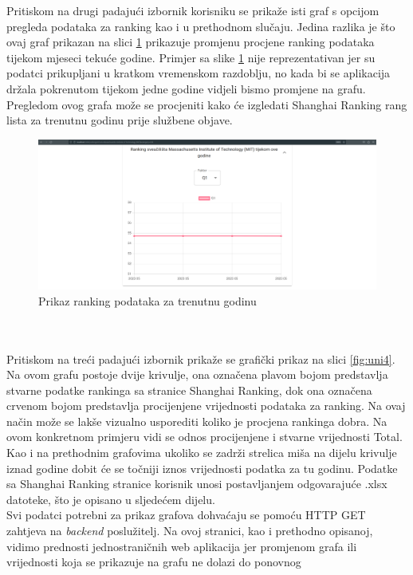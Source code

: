 \documentclass[times, utf8, zavrsni]{fer}
\begin{document}
\FloatBarrier 
Pritiskom na drugi padajući izbornik korisniku se prikaže isti graf s opcijom pregleda podataka za ranking
kao i u prethodnom slučaju. Jedina razlika je što ovaj graf prikazan na slici \ref{fig:uni3}
prikazuje promjenu procjene ranking podataka tijekom mjeseci tekuće godine. Primjer sa slike \ref{fig:uni3} nije reprezentativan jer su podatci 
prikupljani u kratkom vremenskom razdoblju, no kada bi se aplikacija držala pokrenutom tijekom jedne godine vidjeli bismo promjene na grafu. Pregledom ovog 
grafa može se procjeniti kako će izgledati Shanghai Ranking rang lista za trenutnu godinu prije službene objave. 
\begin{figure}[htb]
    \hspace*{-2cm}  
       \includegraphics[scale=0.21]{uni3.png} 
       \caption{Prikaz ranking podataka za trenutnu godinu}
       \label{fig:uni3}
       \end{figure} 
\\\\Pritiskom na treći padajući izbornik prikaže se grafički prikaz na slici \ref{fig:uni4}. Na ovom grafu postoje dvije krivulje, ona označena plavom bojom predstavlja 
stvarne podatke rankinga sa stranice Shanghai Ranking, dok ona označena crvenom bojom predstavlja procijenjene vrijednosti podataka za ranking.
Na ovaj način može se lakše vizualno usporediti koliko je procjena rankinga dobra. Na ovom konkretnom primjeru vidi se odnos procijenjene i stvarne 
vrijednosti Total. Kao i na prethodnim grafovima ukoliko se zadrži strelica miša na dijelu krivulje iznad godine dobit će se točniji iznos 
vrijednosti podatka za tu godinu.
Podatke sa Shanghai Ranking stranice korisnik unosi postavljanjem  
odgovarajuće .xlsx datoteke, što je opisano u sljedećem dijelu.
\\Svi podatci potrebni za prikaz grafova dohvaćaju se pomoću HTTP GET zahtjeva na \emph{backend} poslužitelj. Na ovoj stranici, kao i prethodno opisanoj, 
vidimo prednosti jednostraničnih web aplikacija jer promjenom grafa ili vrijednosti koja se prikazuje na grafu ne dolazi do ponovnog 
\end{document}
